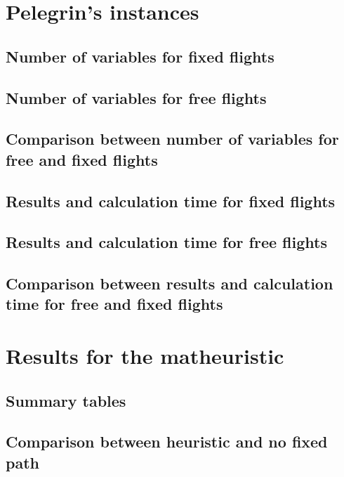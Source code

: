 \documentclass[a4paper,12pt]{report}
\begin{document}
\section{Pelegrin's instances}
\subsection{Number of variables for fixed flights}

\subsection{Number of variables for free flights}

\subsection{Comparison between number of variables for free and fixed flights}

\subsection{Results and calculation time for fixed flights}

\subsection{Results and calculation time for free flights}

\subsection{Comparison between results and calculation time for free and fixed flights}

\section{Results for the matheuristic}
\subsection{Summary tables}
\label{chap:heuristic:tables}
\subsection{Comparison between heuristic and no fixed path}

\end{document}
